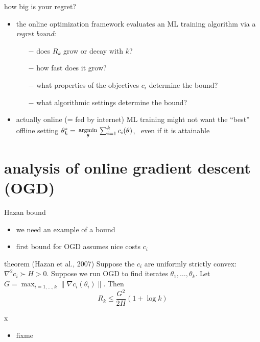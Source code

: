 \documentclass[xcolor={svgnames},
               hyperref={colorlinks,citecolor=DeepPink4,linkcolor=FireBrick,urlcolor=Maroon}]
               {beamer}
\newcommand{\grad}{\nabla}
\begin{document}
\begin{frame}{how big is your regret?}

\begin{itemize}
\item the online optimization framework evaluates an ML training algorithm via a \emph{regret bound}:
    \begin{itemize}
    \item[$-$] does $R_k$ grow or decay with $k$?
    \item[$-$] how fast does it grow?
    \item[$-$] what properties of the objectives $c_i$ determine the bound?
    \item[$-$] what algorithmic settings determine the bound?
    \end{itemize}
\item actually online (= fed by internet) ML training might not want the ``best'' offline setting \quad $\theta_k^* = \begin{smallmatrix} \phantom{x} \\ \text{\footnotesize argmin} \\ \theta \end{smallmatrix} \sum_{i=1}^k c_i(\theta)$, \, even if it is attainable
\end{itemize}
\end{frame}


\section{analysis of online gradient descent (OGD)}

\begin{frame}{Hazan bound}

\begin{itemize}
\item we need an example of a bound
\item first bound for OGD assumes nice costs $c_i$
\end{itemize}

\begin{block}{theorem (Hazan et al., 2007)}
Suppose the $c_i$ are uniformly strictly convex: $\grad^2 c_i \succ H > 0$.  Suppose we run OGD to find iterates $\theta_1,\dots,\theta_k$.  Let $G = \max_{i=1,\dots,k} \|\grad c_i(\theta_i)\|$.  Then
    $$R_k \le \frac{G^2}{2 H} (1 + \log k)$$
\end{block}
\end{frame}


\begin{frame}{x}

\begin{itemize}
\item fixme
\end{itemize}
\end{frame}
\end{document}
